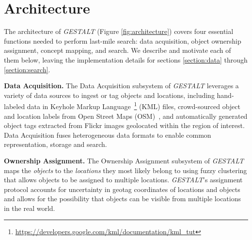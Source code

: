\section{Architecture}
\label{section:architecture}

\begin{figure*}[t]
    
    \centering
    \caption[width=\textwidth]{\emph{GESTALT} consists of a data collection module, an ownership assignment module, a concept mapping module, and a search module.}
    \label{fig:architecture}
\end{figure*}


The architecture of \textit{GESTALT} (Figure \ref{fig:architecture}) covers four essential functions needed to perform last-mile search: data acquisition, object ownership assignment, concept mapping, and search. 
We describe and motivate each of them below, leaving the implementation details for sections \ref{section:data} through \ref{section:search}. 

\textbf{Data Acquisition.}
The Data Acquisition subsystem of \emph{GESTALT} leverages a variety of data sources to ingest or tag objects and locations, including hand-labeled data in Keyhole Markup Language~\footnote{\href{https://developers.google.com/kml/documentation/kml\_tut}{https://developers.google.com/kml/documentation/kml\_tut}} (KML) files, crowd-sourced object and location labels from Open Street Maps (OSM)~\cite{Haklay2008}, and automatically generated object tags extracted from Flickr images geolocated within the region of interest. 
Data Acquisition fuses heterogeneous data formats to enable common representation, storage and search.

\textbf{Ownership Assignment.}
The Ownership Assignment subsystem of \emph{GESTALT} maps the \textit{objects} to the \textit{locations} they most likely belong to using fuzzy clustering that allows objects to be assigned to multiple locations. 
\emph{GESTALT}'s assignment protocol accounts for uncertainty in geotag coordinates of locations and objects and allows for the possibility that objects can be visible from multiple locations in the real world.

